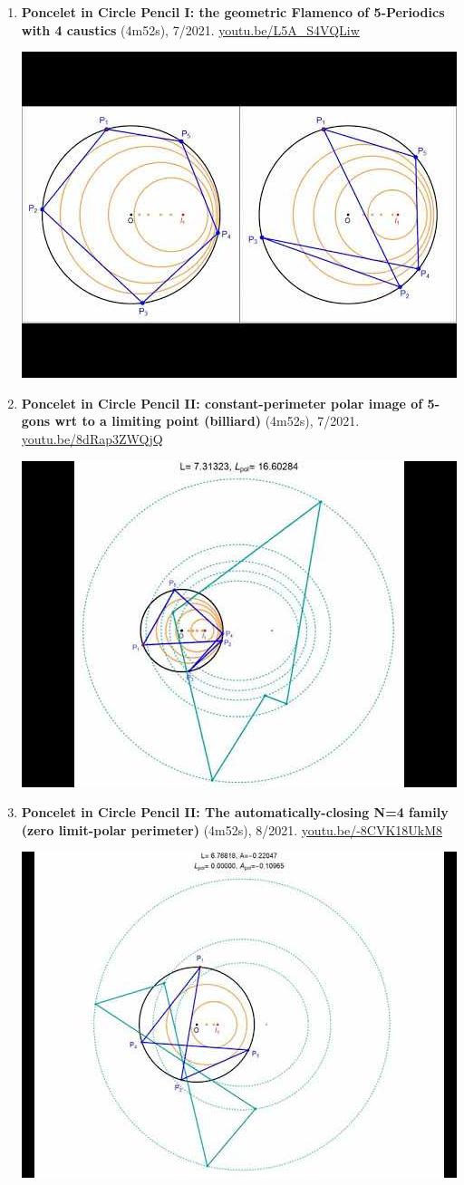 \documentclass[12pt]{article}
\begin{document}
\begin{enumerate}[resume]
\item \textbf{Poncelet in Circle Pencil I: the geometric Flamenco of 5-Periodics with 4 caustics} (4m52s), 7/2021. \href{https://youtu.be/L5A_S4VQLiw}{\url{youtu.be/L5A\_S4VQLiw}}
\begin{center}\includegraphics[width=.5\textwidth]{pics/L5A_S4VQLiw.jpg}\end{center}
% 
\item \textbf{Poncelet in Circle Pencil II: constant-perimeter polar image of 5-gons wrt to a limiting point (billiard)} (4m52s), 7/2021. \href{https://youtu.be/8dRap3ZWQjQ}{\url{youtu.be/8dRap3ZWQjQ}}
\begin{center}\includegraphics[width=.5\textwidth]{pics/8dRap3ZWQjQ.jpg}\end{center}
% 
\item \textbf{Poncelet in Circle Pencil II: The automatically-closing N=4 family (zero limit-polar perimeter)} (4m52s), 8/2021. \href{https://youtu.be/-8CVK18UkM8}{\url{youtu.be/-8CVK18UkM8}}
\begin{center}\includegraphics[width=.5\textwidth]{pics/-8CVK18UkM8.jpg}\end{center}

\end{enumerate}
\end{document}
